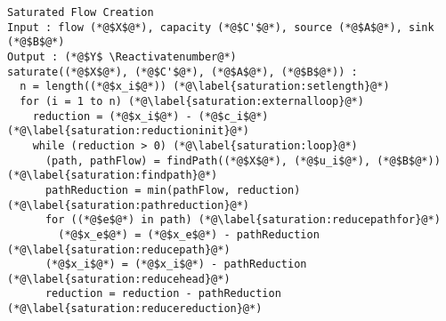 {}
\Suppressnumber
\begin{lstlisting}[label=saturationcode, style=numbers]
Saturated Flow Creation
Input : flow (*@$X$@*), capacity (*@$C'$@*), source (*@$A$@*), sink (*@$B$@*)
Output : (*@$Y$ \Reactivatenumber@*)
saturate((*@$X$@*), (*@$C'$@*), (*@$A$@*), (*@$B$@*)) :
  n = length((*@$x_i$@*)) (*@\label{saturation:setlength}@*)
  for (i = 1 to n) (*@\label{saturation:externalloop}@*)
    reduction = (*@$x_i$@*) - (*@$c_i$@*) (*@\label{saturation:reductioninit}@*)
    while (reduction > 0) (*@\label{saturation:loop}@*)
      (path, pathFlow) = findPath((*@$X$@*), (*@$u_i$@*), (*@$B$@*)) (*@\label{saturation:findpath}@*)
      pathReduction = min(pathFlow, reduction) (*@\label{saturation:pathreduction}@*)
      for ((*@$e$@*) in path) (*@\label{saturation:reducepathfor}@*)
        (*@$x_e$@*) = (*@$x_e$@*) - pathReduction (*@\label{saturation:reducepath}@*)
      (*@$x_i$@*) = (*@$x_i$@*) - pathReduction (*@\label{saturation:reducehead}@*)
      reduction = reduction - pathReduction (*@\label{saturation:reducereduction}@*)
\end{lstlisting}
